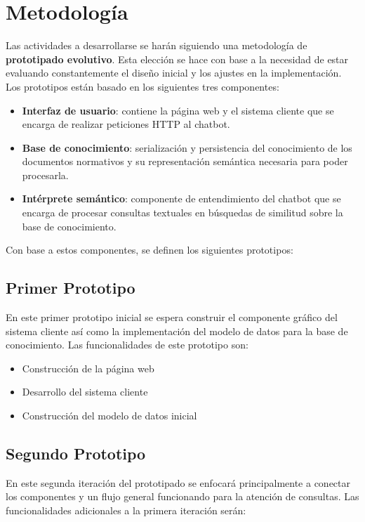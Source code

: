 \section{Metodología}

Las actividades a desarrollarse se harán siguiendo una metodología de \textbf{prototipado evolutivo}. Esta elección se hace con base a la necesidad de estar evaluando constantemente el diseño inicial y los ajustes en la implementación. Los prototipos están basado en los siguientes tres componentes:

\begin{itemize}
    \item \textbf{Interfaz de usuario}: contiene la página web y el sistema cliente que se encarga de realizar peticiones HTTP al chatbot.
    \item \textbf{Base de conocimiento}: serialización y persistencia del conocimiento de los documentos normativos y su representación semántica necesaria para poder procesarla.
    \item \textbf{Intérprete semántico}: componente de entendimiento del chatbot que se encarga de procesar consultas textuales en búsquedas de similitud sobre la base de conocimiento.
\end{itemize}

Con base a estos componentes, se definen los siguientes prototipos:

\subsection{Primer Prototipo}

En este primer prototipo inicial se espera construir el componente gráfico del sistema cliente así como la implementación del modelo de datos para la base de conocimiento. Las funcionalidades de este prototipo son:

\begin{itemize}
    \item Construcción de la página web
    \item Desarrollo del sistema cliente
    \item Construcción del modelo de datos inicial
\end{itemize}

\subsection{Segundo Prototipo}

En este segunda iteración del prototipado se enfocará principalmente a conectar los componentes y un flujo general funcionando para la atención de consultas. Las funcionalidades adicionales a la primera iteración serán:

